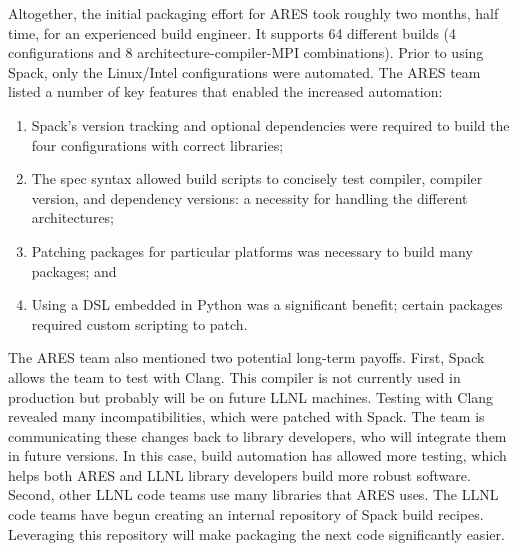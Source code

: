 Altogether, the initial packaging effort for ARES took roughly two months,
half time, for an experienced build engineer. It supports 64 different builds
(4 configurations and 8 architecture-compiler-MPI combinations). Prior to 
using Spack, only the Linux/Intel configurations were automated. The ARES 
team listed a number of key features that enabled the increased automation:
\begin{enumerate}
\item Spack's version tracking and optional dependencies were required to
      build the four configurations with correct libraries;
\item The spec syntax allowed build scripts to concisely test compiler,
      compiler version, and dependency versions: a necessity
      for handling the different architectures;
\item Patching packages for particular platforms was
      necessary to build many packages; and
\item Using a DSL embedded in Python was a significant benefit;
      certain packages required custom scripting to patch.
\end{enumerate}

The ARES team also mentioned two potential long-term payoffs. First, Spack 
allows the team to test with Clang.  This compiler is not currently used in
production but probably will be on future LLNL machines. Testing with Clang 
revealed many incompatibilities, which were patched with Spack. The team is 
communicating these changes back to library developers, who will integrate 
them in future versions. In this case, build automation has allowed more 
testing, which helps both ARES and LLNL library developers build more robust 
software. Second, other LLNL code teams use many libraries that ARES uses.
The LLNL code teams have begun creating an internal repository of Spack 
build recipes.  Leveraging this repository will make packaging the next 
code significantly easier.
